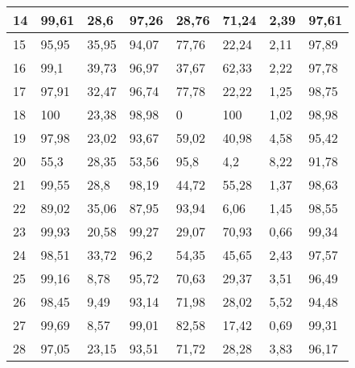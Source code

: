 \begin{longtable}[c]{|l|l|l|l|l|l|l|l|}
14              & 99,61        & 28,6         & 97,26       & 28,76         & 71,24         & 2,39          & 97,61         \\ \hline
15              & 95,95        & 35,95        & 94,07       & 77,76         & 22,24         & 2,11          & 97,89         \\ \hline
16              & 99,1         & 39,73        & 96,97       & 37,67         & 62,33         & 2,22          & 97,78         \\ \hline
17              & 97,91        & 32,47        & 96,74       & 77,78         & 22,22         & 1,25          & 98,75         \\ \hline
18              & 100          & 23,38        & 98,98       & 0             & 100           & 1,02          & 98,98         \\ \hline
19              & 97,98        & 23,02        & 93,67       & 59,02         & 40,98         & 4,58          & 95,42         \\ \hline
20              & 55,3         & 28,35        & 53,56       & 95,8          & 4,2           & 8,22          & 91,78         \\ \hline
21              & 99,55        & 28,8         & 98,19       & 44,72         & 55,28         & 1,37          & 98,63         \\ \hline
22              & 89,02        & 35,06        & 87,95       & 93,94         & 6,06          & 1,45          & 98,55         \\ \hline
23              & 99,93        & 20,58        & 99,27       & 29,07         & 70,93         & 0,66          & 99,34         \\ \hline
24              & 98,51        & 33,72        & 96,2        & 54,35         & 45,65         & 2,43          & 97,57         \\ \hline
25              & 99,16        & 8,78         & 95,72       & 70,63         & 29,37         & 3,51          & 96,49         \\ \hline
26              & 98,45        & 9,49         & 93,14       & 71,98         & 28,02         & 5,52          & 94,48         \\ \hline
27              & 99,69        & 8,57         & 99,01       & 82,58         & 17,42         & 0,69          & 99,31         \\ \hline
28              & 97,05        & 23,15        & 93,51       & 71,72         & 28,28         & 3,83          & 96,17         \\ \hline

\end{longtable}
